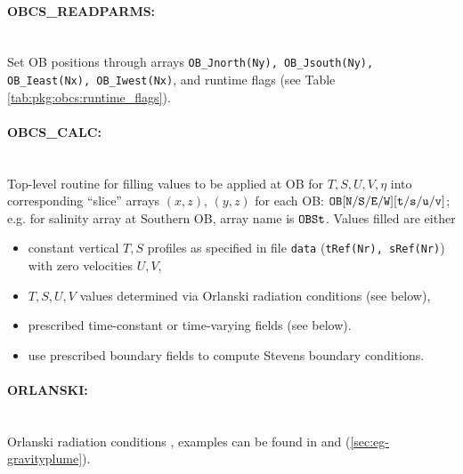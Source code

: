 \paragraph{OBCS\_READPARMS:} ~ \\
Set OB positions through arrays
{\tt OB\_Jnorth(Ny), OB\_Jsouth(Ny), OB\_Ieast(Nx), OB\_Iwest(Nx)},
and runtime flags (see Table \ref{tab:pkg:obcs:runtime_flags}).

\paragraph{OBCS\_CALC:} ~ \\
%
Top-level routine for filling values to be applied at OB for 
$T,S,U,V,\eta$ into corresponding 
``slice'' arrays $(x,z)$, $(y,z)$ for each OB:
$\tt OB[N/S/E/W][t/s/u/v]$; e.g. for salinity array at
Southern OB, array name is $\tt OBSt$.
Values filled are either
%
\begin{itemize}
%
\item
constant vertical $T,S$ profiles as specified in file
{\tt data} ({\tt tRef(Nr), sRef(Nr)}) with zero velocities $U,V$,
%
\item
$T,S,U,V$ values determined via Orlanski radiation conditions
(see below),
%
\item
prescribed time-constant or time-varying fields (see below).
%
\item 
use prescribed boundary fields to compute Stevens boundary conditions.
\end{itemize}


\paragraph{ORLANSKI:} ~ \\
%
Orlanski radiation conditions \citep{orl:76}, examples can be found in
 and
(\ref{sec:eg-gravityplume}).

